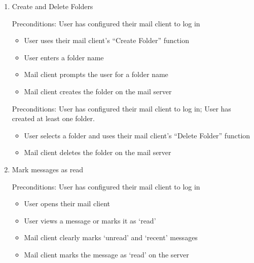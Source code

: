 \documentclass[a4paper,12pt]{article}
\begin{document}
\begin{enumerate}
\item Create and Delete Folders

Preconditions: User has configured their mail client to log in

  \begin{multicols}{2}
    \begin{itemize}
    \item User uses their mail client's ``Create Folder'' function
    \item User enters a folder name
      \vfill \columnbreak
    \item Mail client prompts the user for a folder name
    \item Mail client creates the folder on the mail server
    \end{itemize}
  \end{multicols}

Preconditions: User has configured their mail client to log in; User has created at least one folder.

  \begin{multicols}{2}
    \begin{itemize}
    \item User selects a folder and uses their mail client's ``Delete Folder'' function
      \vfill \columnbreak
    \item Mail client deletes the folder on the mail server
    \end{itemize}
  \end{multicols}

\item Mark messages as read

Preconditions: User has configured their mail client to log in

  \begin{multicols}{2}
    \begin{itemize}
    \item User opens their mail client
      \\
    \item User views a message or marks it as `read'
      \vfill \columnbreak
    \item Mail client clearly marks `unread' and `recent' messages
    \item Mail client marks the message as `read' on the server
    \end{itemize}
  \end{multicols}

\end{enumerate}
\end{document}
